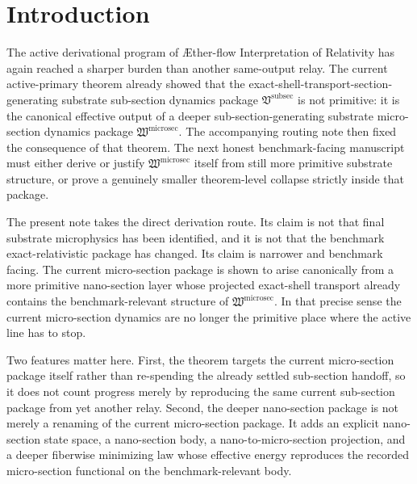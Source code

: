\documentclass[11pt]{article}
\newcommand{\Aflow}{\AE{}ther-flow}
\newcommand{\TheoryName}{\Aflow{} Interpretation of Relativity}
\newcommand{\SubSectionPackage}{\mathfrak V^{\mathrm{subsec}}}
\newcommand{\MicroSectionPackage}{\mathfrak W^{\mathrm{microsec}}}
\begin{document}
\section{Introduction}

The active derivational program of \TheoryName{} has again reached a sharper burden than another same-output relay. The current active-primary theorem already showed that the exact-shell-transport-section-generating substrate sub-section dynamics package \(\SubSectionPackage\) is not primitive: it is the canonical effective output of a deeper sub-section-generating substrate micro-section dynamics package \(\MicroSectionPackage\). The accompanying routing note then fixed the consequence of that theorem. The next honest benchmark-facing manuscript must either derive or justify \(\MicroSectionPackage\) itself from still more primitive substrate structure, or prove a genuinely smaller theorem-level collapse strictly inside that package.

The present note takes the direct derivation route. Its claim is not that final substrate microphysics has been identified, and it is not that the benchmark exact-relativistic package has changed. Its claim is narrower and benchmark facing. The current micro-section package is shown to arise canonically from a more primitive nano-section layer whose projected exact-shell transport already contains the benchmark-relevant structure of \(\MicroSectionPackage\). In that precise sense the current micro-section dynamics are no longer the primitive place where the active line has to stop.

Two features matter here. First, the theorem targets the current micro-section package itself rather than re-spending the already settled sub-section handoff, so it does not count progress merely by reproducing the same current sub-section package from yet another relay. Second, the deeper nano-section package is not merely a renaming of the current micro-section package. It adds an explicit nano-section state space, a nano-section body, a nano-to-micro-section projection, and a deeper fiberwise minimizing law whose effective energy reproduces the recorded micro-section functional on the benchmark-relevant body.
\end{document}
